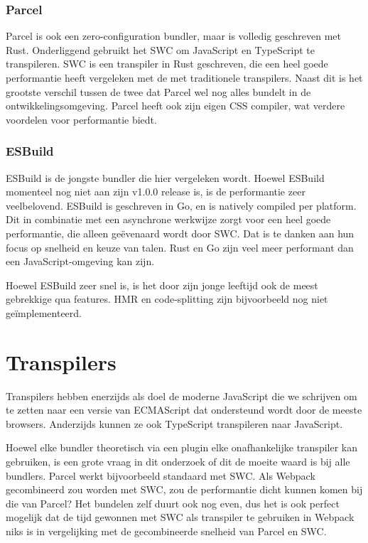 \subsubsection{Parcel}

Parcel is ook een zero-configuration bundler, maar is volledig geschreven met Rust. Onderliggend gebruikt het SWC om JavaScript en TypeScript te transpileren. SWC is een transpiler in Rust geschreven, die een heel goede performantie heeft vergeleken met de met traditionele transpilers. Naast dit is het grootste verschil tussen de twee dat Parcel wel nog alles bundelt in de ontwikkelingsomgeving. Parcel heeft ook zijn eigen CSS compiler, wat verdere voordelen voor performantie biedt. \autocite{dahan_2021}

\subsubsection{ESBuild}

ESBuild is de jongste bundler die hier vergeleken wordt. Hoewel ESBuild momenteel nog niet aan zijn v1.0.0 release is, is de performantie zeer veelbelovend. ESBuild is geschreven in Go, en is natively compiled per platform. Dit in combinatie met een asynchrone werkwijze zorgt voor een heel goede performantie, die alleen geëvenaard wordt door SWC. Dat is te danken aan hun focus op snelheid en keuze van talen. Rust en Go zijn veel meer performant dan een JavaScript-omgeving kan zijn. \autocite{eaton_2021}

Hoewel ESBuild zeer snel is, is het door zijn jonge leeftijd ook de meest gebrekkige qua features. HMR en code-splitting zijn bijvoorbeeld nog niet geïmplementeerd. \autocite{wallace}

\section{Transpilers}

Transpilers hebben enerzijds als doel de moderne JavaScript die we schrijven om te zetten naar een versie van ECMAScript dat ondersteund wordt door de meeste browsers. Anderzijds kunnen ze ook TypeScript transpileren naar JavaScript. 

Hoewel elke bundler theoretisch via een plugin elke onafhankelijke transpiler kan gebruiken, is een grote vraag in dit onderzoek of dit de moeite waard is bij alle bundlers. Parcel werkt bijvoorbeeld standaard met SWC. Als Webpack gecombineerd zou worden met SWC, zou de performantie dicht kunnen komen bij die van Parcel? Het bundelen zelf duurt ook nog even, dus het is ook perfect mogelijk dat de tijd gewonnen met SWC als transpiler te gebruiken in Webpack niks is in vergelijking met de gecombineerde snelheid van Parcel en SWC.

